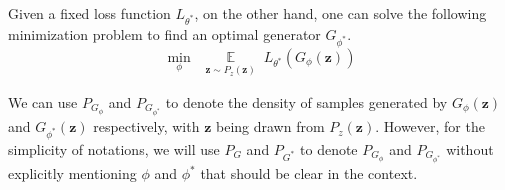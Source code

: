 %
%

Given a fixed loss function $L_{\theta^*}$, on the other hand, one can solve the following minimization problem to find an optimal generator $G_{\phi^*}$.
\begin{equation}\label{eq:generator}
\min_{\phi}~\mathop \mathbb E\limits_{\substack{\mathbf z\sim P_z(\mathbf z)}} L_{\theta^*}(G_\phi(\mathbf z))
\end{equation}

We can use $P_{G_\phi}$ and $P_{G_{\phi^*}}$ to denote the density of samples generated by $G_\phi(\mathbf z)$ and $G_{\phi^*}(\mathbf z)$ respectively, with $\mathbf z$ being drawn from $P_z(\mathbf z)$. However, for the simplicity of notations, we will use $P_{G}$ and $P_{G^*}$ to denote $P_{G_\phi}$ and $P_{G_{\phi^*}}$ without explicitly mentioning $\phi$ and $\phi^*$ that should be clear in the context.

